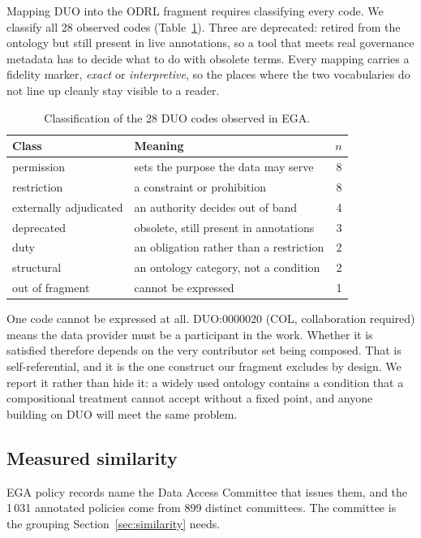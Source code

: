 \documentclass[sigconf,anonymous,review]{acmart}
\begin{document}
Mapping DUO into the ODRL fragment requires classifying every code. We classify
all 28 observed codes (Table~\ref{tab:duo}). Three are deprecated: retired from
the ontology but still present in live annotations, so a tool that meets real
governance metadata has to decide what to do with obsolete terms. Every mapping
carries a fidelity marker, \emph{exact} or \emph{interpretive}, so the places
where the two vocabularies do not line up cleanly stay visible to a reader.

\begin{table}[h]
\caption{Classification of the 28 DUO codes observed in EGA.}
\label{tab:duo}
\begin{tabular}{llr}
\toprule
Class & Meaning & $n$ \\
\midrule
permission & sets the purpose the data may serve & 8 \\
restriction & a constraint or prohibition & 8 \\
externally adjudicated & an authority decides out of band & 4 \\
deprecated & obsolete, still present in annotations & 3 \\
duty & an obligation rather than a restriction & 2 \\
structural & an ontology category, not a condition & 2 \\
out of fragment & cannot be expressed & 1 \\
\bottomrule
\end{tabular}
\end{table}

One code cannot be expressed at all. DUO:0000020 (COL, collaboration required)
means the data provider must be a participant in the work. Whether it is
satisfied therefore depends on the very contributor set being composed. That is
self-referential, and it is the one construct our fragment excludes by design. We
report it rather than hide it: a widely used ontology contains a condition that a
compositional treatment cannot accept without a fixed point, and anyone building
on DUO will meet the same problem.

\subsection{Measured similarity}
\label{sec:measured}

EGA policy records name the Data Access Committee that issues them, and the
1\,031 annotated policies come from 899 distinct committees. The committee is the
grouping Section~\ref{sec:similarity} needs.
\end{document}
